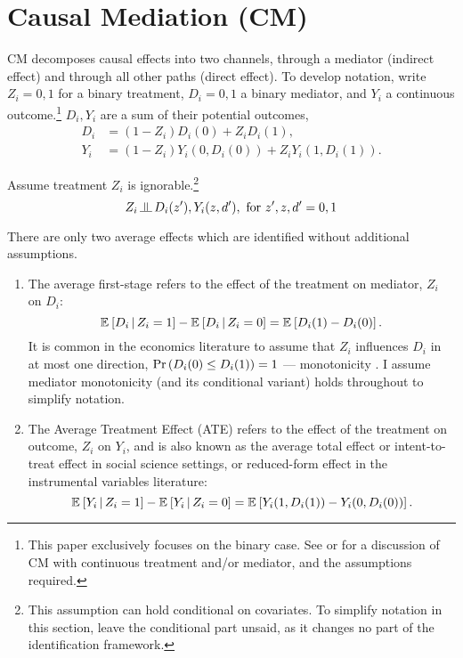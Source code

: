 \section{Causal Mediation (CM)}
\label{sec:mediation}
CM decomposes causal effects into two channels, through a mediator (indirect effect) and through all other paths (direct effect).
To develop notation, write $Z_i = 0, 1$ for a binary treatment, $D_i = 0, 1$ a binary mediator, and $Y_i$ a continuous outcome.\footnote{
    This paper exclusively focuses on the binary case.
    See \cite{huber2020direct} or \cite{frolich2017direct} for a discussion of CM with continuous treatment and/or mediator, and the assumptions required.
}
$D_i, Y_i$ are a sum of their potential outcomes,
\begin{align*}
    D_i &= (1 - Z_i) D_i(0)
        +   Z_i      D_i(1),  \\
    Y_i &= (1 - Z_i) Y_i(0, D_i(0))
        +   Z_i      Y_i(1, D_i(1)).
\end{align*}

Assume treatment $Z_i$ is ignorable.\footnote{
    This assumption can hold conditional on covariates.
    To simplify notation in this section, leave the conditional part unsaid, as it changes no part of the identification framework.
}
\[ Z_i \indep  D_i(z'), Y_i(z, d'), \text{ for } z', z, d' = 0, 1 \]

There are only two average effects which are identified without additional assumptions.
\begin{enumerate}
    \item The average first-stage refers to the effect of the treatment on mediator, $Z_i$ on $D_i$:
    \[ \mathbb{E}_{} \left[ D_i \, \middle\vert \, Z_i = 1 \right] - \mathbb{E}_{} \left[ D_i \, \middle\vert \, Z_i = 0 \right]
        = \mathbb{E}_{} \left[ D_i(1) - D_i(0) \right]. \]
    It is common in the economics literature to assume that $Z_i$ influences $D_i$ in at most one direction, $\Pr\left( D_i(0) \leq D_i(1) \right) = 1$ --- monotonicity \citep{imbens1994identification}.
    I assume mediator monotonicity (and its conditional variant) holds throughout to simplify notation.
    \item The Average Treatment Effect (ATE) refers to the effect of the treatment on outcome, $Z_i$ on $Y_i$, and is also known as the average total effect or intent-to-treat effect in social science settings, or reduced-form effect in the instrumental variables literature:
    \[ \mathbb{E}_{} \left[ Y_i \, \middle\vert \, Z_i = 1 \right] - \mathbb{E}_{} \left[ Y_i \, \middle\vert \, Z_i = 0 \right]
        = \mathbb{E}_{} \left[ Y_i(1, D_i(1)) - Y_i(0, D_i(0)) \right]. \]
\end{enumerate}

